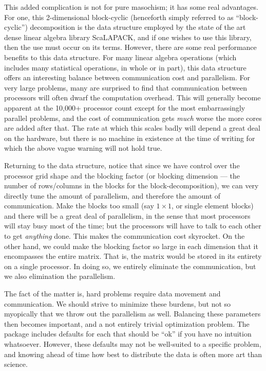 This added complication is not for pure masochism; it has some real advantages.  
For one, this 2-dimensional block-cyclic (henceforth simply referred to as 
``block-cyclic'') decomposition is the data structure employed by the state of 
the art dense linear algebra library ScaLAPACK, and if 
one wishes to use this library, then the use must occur on its terms.  However, 
there are some real performance benefits to this data structure.  For many 
linear algebra operations (which includes many statistical operations, in whole 
or in part), this data structure offers an interesting balance between 
communication cost and parallelism.  For very large problems, many are surprised 
to find that communication between processors will often dwarf the computation 
overhead.  This will generally become apparent at the 10,000+ processor count 
except for the most embarrassingly parallel problems, and the cost of 
communication gets \emph{much} worse the more cores are added after that.  The 
rate at which 
this scales badly will depend a great deal on the hardware, but there is no 
machine in existence at the time of writing for which the above vague warning 
will not hold true.

Returning to the data structure, notice that since we have control over the 
processor grid shape and the blocking factor (or blocking dimension --- the 
number of rows/columns in the blocks for the block-decomposition), we can very 
directly tune the amount of parallelism, and therefore the amount of 
communication.  Make the blocks too small (say $1\times 1$, or single element 
blocks) and there will be a great deal of parallelism, in the sense that most 
processors will stay busy most of the time; but the processors will have to talk 
to each other to get \emph{anything} done.  This makes the communication cost 
skyrocket.  On the other hand, we could make the blocking factor so large in 
each dimension that it encompasses the entire matrix.  That is, the matrix would 
be stored in its entirety on a single processor.  In doing so, we entirely 
eliminate the communication, but we also elimination the parallelism.

The fact of the matter is, hard problems require data movement and 
communication.  We should strive to minimize these burdens, but not so 
myopically that we throw out the parallelism as well.  Balancing these 
parameters then becomes important, and a not entirely trivial optimization 
problem.  The  package includes defaults for each that should be 
``ok'' if you have no intuition whatsoever.  However, these defaults may not be 
well-suited to a specific problem, and knowing ahead of time how best to 
distribute the data is often more art than science.

